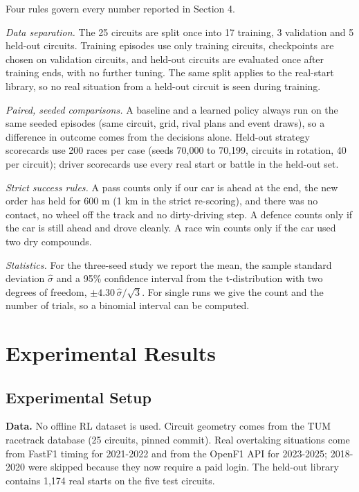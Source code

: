 \documentclass{ieeeaccess}
\begin{document}
Four rules govern every number reported in Section 4.

\emph{Data separation.} The 25 circuits are split once into 17 training, 3 validation and
5 held-out circuits. Training episodes use only training circuits, checkpoints are
chosen on validation circuits, and held-out circuits are evaluated once after
training ends, with no further tuning. The same split applies to the real-start
library, so no real situation from a held-out circuit is seen during training.

\emph{Paired, seeded comparisons.} A baseline and a learned policy always run on the same
seeded episodes (same circuit, grid, rival plans and event draws), so a difference
in outcome comes from the decisions alone. Held-out strategy scorecards use 200
races per case (seeds 70,000 to 70,199, circuits in rotation, 40 per circuit);
driver scorecards use every real start or battle in the held-out set.

\emph{Strict success rules.} A pass counts only if our car is ahead at the end, the new
order has held for 600 m (1 km in the strict re-scoring), and there was no contact,
no wheel off the track and no dirty-driving step. A defence counts only if the car
is still ahead and drove cleanly. A race win counts only if the car used two dry
compounds.

\emph{Statistics.} For the three-seed study we report the mean, the sample standard
deviation \(\hat\sigma\) and a 95\% confidence interval from the t-distribution with
two degrees of freedom, \(\pm 4.30\,\hat\sigma/\sqrt 3\). For single runs we give the
count and the number of trials, so a binomial interval can be computed.

\section{Experimental Results}

\subsection{Experimental Setup}

\textbf{Data.} No offline RL dataset is used. Circuit geometry comes from the TUM
racetrack database (25 circuits, pinned commit). Real overtaking situations come
from FastF1 timing for 2021-2022 and from the OpenF1 API for 2023-2025; 2018-2020
were skipped because they now require a paid login. The held-out library contains
1,174 real starts on the five test circuits.
\end{document}
